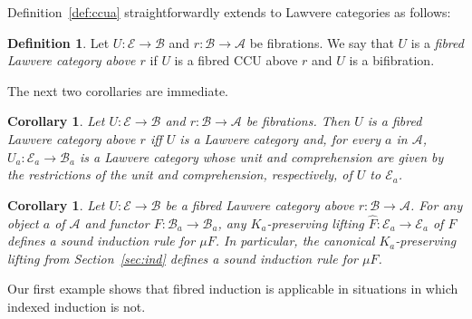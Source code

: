 \documentclass{LMCS}
\newcommand\E{{\mathcal E}}
\newcommand\B{{\mathcal B}}
\newcommand\A{{\mathcal A}}
\theoremstyle{plain}
\newtheorem{corollary}[theorem]{Corollary}
\theoremstyle{remark}
\theoremstyle{definition}
\newtheorem{definition}[theorem]{Definition}
\begin{document}
Definition~\ref{def:ccua} straightforwardly extends to Lawvere
categories as follows:

\begin{definition}\label{def:lwfiba}
  Let $U:\E\to\B$ and $r:\B\to\A$ be fibrations. We say that $U$ is a
  {\em fibred Lawvere category above $r$} if $U$ is a fibred CCU above $r$ 
  and $U$ is a bifibration.
\end{definition}

\noindent
The next two corollaries are immediate.

\begin{corollary}\label{cor:lwfaadj}
  Let $U:\E\to\B$ and $r:\B\to\A$ be fibrations. Then $U$ is a fibred
  Lawvere category above $r$ iff $U$ is a Lawvere category and, for
  every $a$ in $\A$, $U_a : \E_a \to \B_a$ is a Lawvere category whose
  unit and comprehension are given by the restrictions of the unit and
  comprehension, respectively, of $U$ to $\E_a$.
\end{corollary}

\begin{corollary}\label{cor:iind}
  Let $U:\E\to\B$ be a fibred Lawvere category above $r:\B\to\A$. For
  any object $a$ of $\A$ and functor $F:\B_a\to\B_a$, any
  $K_a$-preserving lifting $\hat{F}:\E_a\to\E_a$ of $F$ defines a
  sound induction rule for $\mu F$. In particular, the canonical
  $K_a$-preserving lifting from Section~\ref{sec:ind} defines a sound
  induction rule for $\mu F$.
\end{corollary}

Our first example shows that fibred induction is applicable in
situations in which indexed induction is not.
\end{document}

